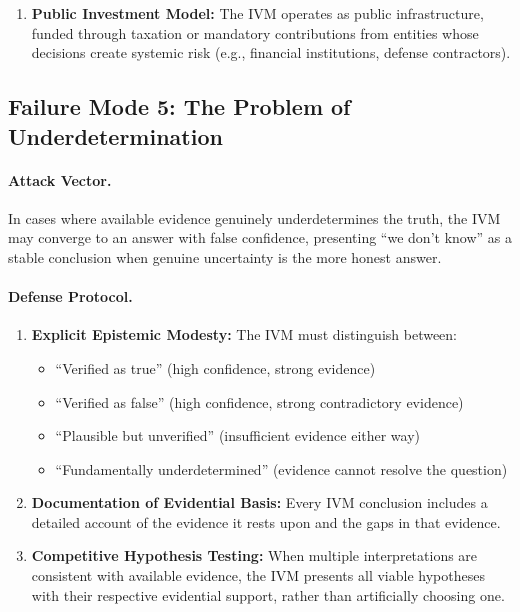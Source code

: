 \documentclass[11pt,a4paper]{article}
\begin{document}
\begin{small}
\begin{enumerate}
    \item \textbf{Public Investment Model:} The IVM operates as public infrastructure, funded through taxation or mandatory contributions from entities whose decisions create systemic risk (e.g., financial institutions, defense contractors).
\end{enumerate}

\subsection{Failure Mode 5: The Problem of Underdetermination}

\paragraph{Attack Vector.} In cases where available evidence genuinely underdetermines the truth, the IVM may converge to an answer with false confidence, presenting ``we don't know'' as a stable conclusion when genuine uncertainty is the more honest answer.

\paragraph{Defense Protocol.}

\begin{enumerate}
    \item \textbf{Explicit Epistemic Modesty:} The IVM must distinguish between:
    \begin{itemize}
        \item ``Verified as true'' (high confidence, strong evidence)
        \item ``Verified as false'' (high confidence, strong contradictory evidence)
        \item ``Plausible but unverified'' (insufficient evidence either way)
        \item ``Fundamentally underdetermined'' (evidence cannot resolve the question)
    \end{itemize}
    
    \item \textbf{Documentation of Evidential Basis:} Every IVM conclusion includes a detailed account of the evidence it rests upon and the gaps in that evidence.
    
    \item \textbf{Competitive Hypothesis Testing:} When multiple interpretations are consistent with available evidence, the IVM presents all viable hypotheses with their respective evidential support, rather than artificially choosing one.
\end{enumerate}


\end{small}
\end{document}
